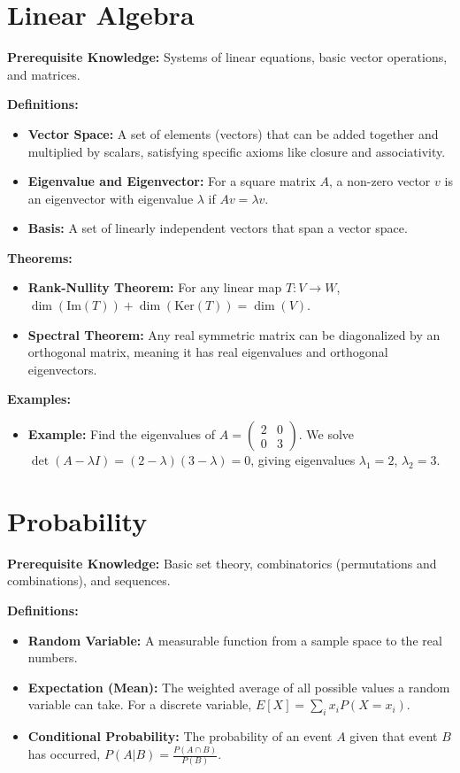 \section{Linear Algebra}
\textbf{Prerequisite Knowledge:} Systems of linear equations, basic vector operations, and matrices.

\textbf{Definitions:}
\begin{itemize}
    \item \textbf{Vector Space:} A set of elements (vectors) that can be added together and multiplied by scalars, satisfying specific axioms like closure and associativity.
    \item \textbf{Eigenvalue and Eigenvector:} For a square matrix $A$, a non-zero vector $v$ is an eigenvector with eigenvalue $\lambda$ if $Av = \lambda v$.
    \item \textbf{Basis:} A set of linearly independent vectors that span a vector space.
\end{itemize}

\textbf{Theorems:}
\begin{itemize}
    \item \textbf{Rank-Nullity Theorem:} For any linear map $T: V \to W$, $\dim(\text{Im}(T)) + \dim(\text{Ker}(T)) = \dim(V)$.
    \item \textbf{Spectral Theorem:} Any real symmetric matrix can be diagonalized by an orthogonal matrix, meaning it has real eigenvalues and orthogonal eigenvectors.
\end{itemize}

\textbf{Examples:}
\begin{itemize}
    \item \textbf{Example:} Find the eigenvalues of $A = \begin{pmatrix} 2 & 0 \\ 0 & 3 \end{pmatrix}$. We solve $\det(A - \lambda I) = (2-\lambda)(3-\lambda) = 0$, giving eigenvalues $\lambda_1 = 2$, $\lambda_2 = 3$.
\end{itemize}


\section{Probability}
\textbf{Prerequisite Knowledge:} Basic set theory, combinatorics (permutations and combinations), and sequences.

\textbf{Definitions:}
\begin{itemize}
    \item \textbf{Random Variable:} A measurable function from a sample space to the real numbers.
    \item \textbf{Expectation (Mean):} The weighted average of all possible values a random variable can take. For a discrete variable, $E[X] = \sum_i x_i P(X = x_i)$.
    \item \textbf{Conditional Probability:} The probability of an event $A$ given that event $B$ has occurred, $P(A|B) = \frac{P(A \cap B)}{P(B)}$.
\end{itemize}

